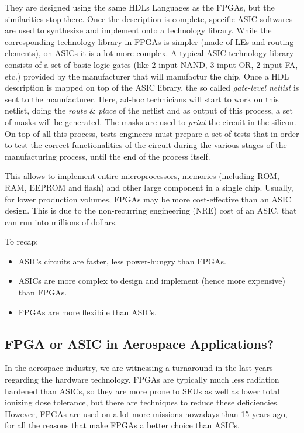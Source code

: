 They are designed using the same HDLs Languages as the FPGAs, but the similarities stop there. Once the description is complete, specific ASIC softwares are used to synthesize and implement onto a technology library. While the corresponding technology library in FPGAs is simpler (made of LEs and routing elements), on ASICs it is a lot more complex. A typical ASIC technology library consists of a set of basic logic gates (like 2 input NAND, 3 input OR, 2 input FA, etc.) provided by the manufacturer that will manufactur the chip. Once a HDL description is mapped on top of the ASIC library, the so called \textit{gate-level netlist} is sent to the manufacturer. Here, ad-hoc technicians will start to work on this netlist, doing the \textit{route} {\&} \textit{place} of the netlist and as output of this process, a set of masks will be generated. The masks are used to \textit{print} the circuit in the silicon. On top of all this process, tests engineers must prepare a set of tests that in order to test the correct functionalities of the circuit during the various stages of the manufacturing process, until the end of the process itself. \bigskip

This allows to implement entire microprocessors, memories (including ROM, RAM, EEPROM and flash) and other large component in a single chip. Usually, for lower production volumes, FPGAs may be more cost-effective than an ASIC design. This is due to the non-recurring engineering (NRE) cost of an ASIC, that can run into millions of dollars. \bigskip

To recap:
\begin{itemize}
    \item ASICs circuits are faster, less power-hungry than FPGAs.
    \item ASICs are more complex to design and implement (hence more expensive) than FPGAs.
    \item FPGAs are more flexibile than ASICs.
\end{itemize}


\subsection{FPGA or ASIC in Aerospace Applications?}

In the aerospace industry, we are witnessing a turnaround in the last years regarding the hardware technology. FPGAs are typically much less radiation hardened than ASICs, so they are more prone to SEUs as well as lower total ionizing dose tolerance, but there are techniques to reduce these deficiencies. However, FPGAs are used on a lot more missions nowadays than 15 years ago, for all the reasons that make FPGAs a better choice than ASICs.\bigskip

